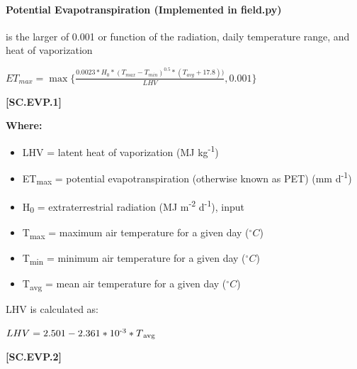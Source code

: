 \paragraph{Potential Evapotranspiration  (Implemented in field.py)}  is the larger of 0.001 or function of the radiation, daily temperature range, and heat of vaporization

    \begin{center}
 \( ET_{max}=\max\{\frac{0.0023 * H_0 * (T_{max} - T_{min})^{0.5} * (T_{avg} + 17.8))}{LHV},0.001\} \)
    \end{center}
        \vspace{0.5cm} 
    
            {\raggedleft \textbf{[SC.EVP.1]}\par}
            \vspace{0.5cm}

        \textbf{Where:}
            
        \begin{itemize}
            \item LHV	=	latent heat of vaporization (MJ kg\textsuperscript{-1})
            \item ET\textsubscript{max}	=	potential evapotranspiration (otherwise known as PET) (mm d\textsuperscript{-1})
            \item H\textsubscript{0}	=	extraterrestrial radiation (MJ m\textsuperscript{-2} d\textsuperscript{-1}), input
            \item T\textsubscript{max}	=	maximum air temperature for a given day (\(^\circ C\))
            \item T\textsubscript{min}	=	minimum air temperature for a given day (\(^\circ C\))
            \item T\textsubscript{avg}	=	mean air temperature for a given day (\(^\circ C\))
        \end{itemize}
\vspace{0.2cm}

LHV is calculated as:

    \begin{center}
 \( LHV=2.501-2.361 * 10\textsuperscript{-3} * T\textsubscript{avg} \)
    \end{center}
        \vspace{0.5cm} 
    
            {\raggedleft \textbf{[SC.EVP.2]}\par}
            \vspace{0.5cm}



